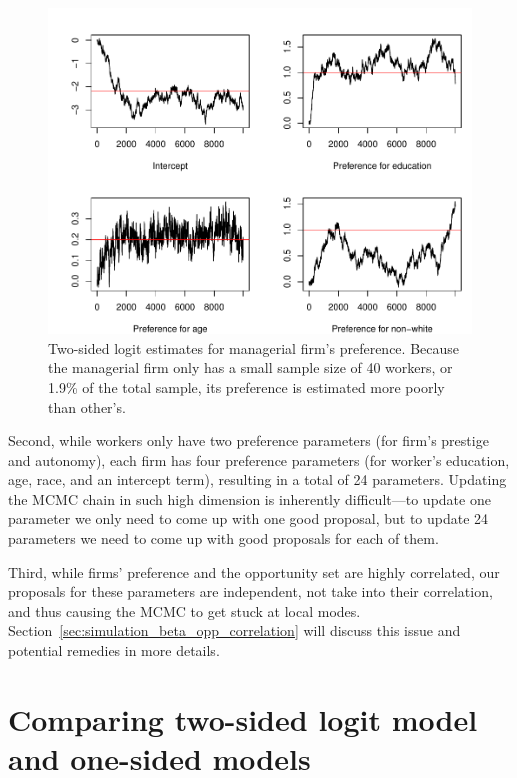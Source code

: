 \begin{figure}[tbp]
  \centering
  \includegraphics[width=\textwidth,keepaspectratio]{../figure/sim_labor_nojobs_beta_emp3}
  \caption[Poor mixing due to small sample size.]{Two-sided logit
    estimates for managerial firm's preference. Because the managerial firm only
    has a small sample size of 40 workers, or 1.9\% of the total sample, its
    preference is estimated more poorly than other's.}
  \label{fig:sim_labor_nojobs_beta_emp3}
\end{figure}

Second, while workers only have two preference parameters (for firm's prestige
and autonomy), each firm has four preference parameters (for worker's education,
age, race, and an intercept term), resulting in a total of 24 parameters.
Updating the MCMC chain in such high dimension is inherently difficult---to
update one parameter we only need to come up with one good proposal, but to
update 24 parameters we need to come up with good proposals for each of them.

Third, while firms' preference and the opportunity set are highly correlated,
our proposals for these parameters are independent, not take into their
correlation, and thus causing the MCMC to get stuck at local modes.
Section~\ref{sec:simulation_beta_opp_correlation} will discuss this issue and
potential remedies in more details.

\section{Comparing two-sided logit model and one-sided models}

